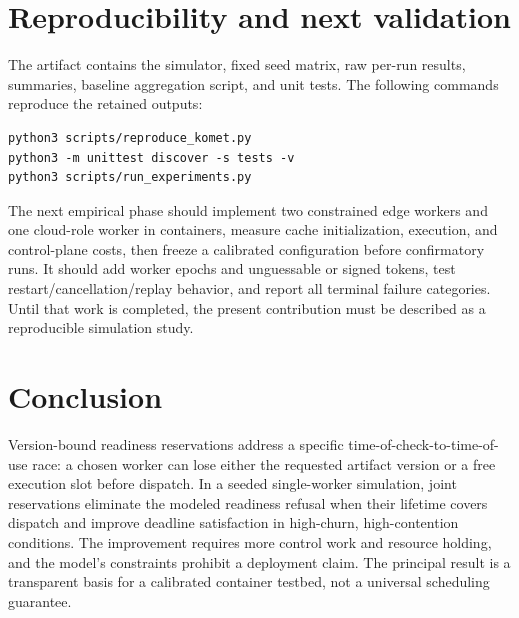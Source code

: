 \documentclass[conference]{IEEEtran}
\begin{document}
\section{Reproducibility and next validation}

The artifact contains the simulator, fixed seed matrix, raw per-run results, summaries, baseline aggregation script, and unit tests. The following commands reproduce the retained outputs:

\begin{verbatim}
python3 scripts/reproduce_komet.py
python3 -m unittest discover -s tests -v
python3 scripts/run_experiments.py
\end{verbatim}

The next empirical phase should implement two constrained edge workers and one cloud-role worker in containers, measure cache initialization, execution, and control-plane costs, then freeze a calibrated configuration before confirmatory runs. It should add worker epochs and unguessable or signed tokens, test restart/cancellation/replay behavior, and report all terminal failure categories. Until that work is completed, the present contribution must be described as a reproducible simulation study.

\section{Conclusion}

Version-bound readiness reservations address a specific time-of-check-to-time-of-use race: a chosen worker can lose either the requested artifact version or a free execution slot before dispatch. In a seeded single-worker simulation, joint reservations eliminate the modeled readiness refusal when their lifetime covers dispatch and improve deadline satisfaction in high-churn, high-contention conditions. The improvement requires more control work and resource holding, and the model's constraints prohibit a deployment claim. The principal result is a transparent basis for a calibrated container testbed, not a universal scheduling guarantee.
\end{document}
